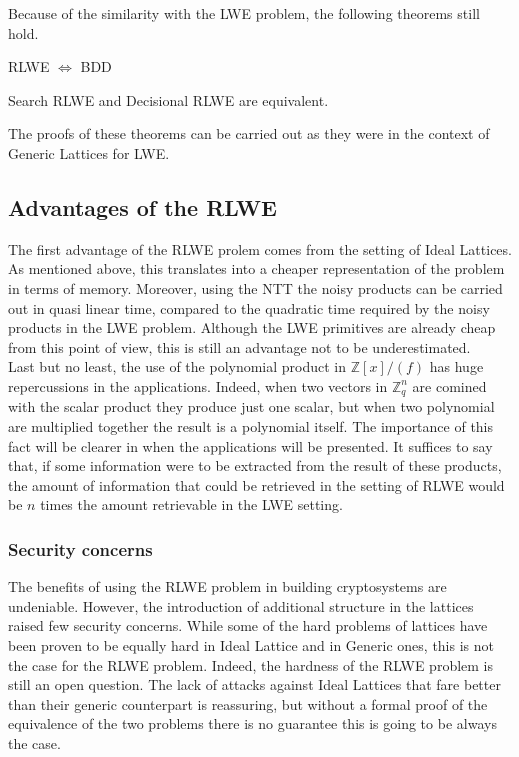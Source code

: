 Because of the similarity with the LWE problem, the following theorems still hold.

\begin{theorem}
RLWE $\Leftrightarrow$ BDD
\end{theorem}
\begin{theorem}
Search RLWE and Decisional RLWE are equivalent.
\end{theorem}

The proofs of these theorems can be carried out as they were in the context of Generic Lattices for LWE.\\

\subsection{Advantages of the RLWE}
The first advantage of the RLWE prolem comes from the setting of Ideal Lattices. As mentioned above, this translates into a cheaper representation of the problem in terms of memory. Moreover, using the NTT the noisy products can be carried out in quasi linear time, compared to the quadratic time required by the noisy products in the LWE problem. Although the LWE primitives are already cheap from this point of view, this is still an advantage not to be underestimated.\\
Last but no least, the use of the polynomial product in $\mathbb{Z}[x]/(f)$ has huge repercussions in the applications. Indeed, when two vectors in $\mathbb{Z}_q^n$ are comined with the scalar product they produce just one scalar, but when two polynomial are multiplied together the result is a polynomial itself. The importance of this fact will be clearer in when the applications will be presented. It suffices to say that, if some information were to be extracted from the result of these products, the amount of information that could be retrieved in the setting of RLWE would be $n$ times the amount retrievable in the LWE setting.

\subsubsection{Security concerns}
The benefits of using the RLWE problem in building cryptosystems are undeniable. However, the introduction of additional structure in the lattices raised few security concerns. While some of the hard problems of lattices have been proven to be equally hard in Ideal Lattice and in Generic ones, this is not the case for the RLWE problem. Indeed, the hardness of the RLWE problem is still an open question. The lack of attacks against Ideal Lattices that fare better than their generic counterpart is reassuring, but without a formal proof of the equivalence of the two problems there is no guarantee this is going to be always the case.
